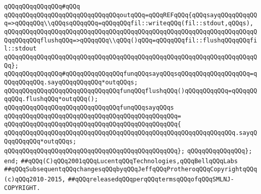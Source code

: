 \verb|qQQqqQQqqQQqqQQq#qQQq|\newline
\verb|qQQqqQQqqQQqqQQqqQQqqQQqqQQqqQQqoutqQQq=qQQqREFqQQq{qQQqsayqQQqqQQqqQQq=>qQQqqQQq\\qQQqsqQQqqQQq=qQQqqQQqfil::writeqQQq(fil::stdout,qQQqs),|\newline
\verb|qQQqqQQqqQQqqQQqqQQqqQQqqQQqqQQqqQQqqQQqqQQqqQQqqQQqqQQqqQQqqQQqqQQqqQQqqQQqqQQqflushqQQq=>qQQqqQQq\\qQQq()qQQq=qQQqqQQqfil::flushqQQqqQQqfil::stdout|\newline
\verb|qQQqqQQqqQQqqQQqqQQqqQQqqQQqqQQqqQQqqQQqqQQqqQQqqQQqqQQqqQQqqQQqqQQqqQQq};|\newline
\newline
\newline
\newline
\verb|qQQqqQQqqQQqqQQq#qQQqqQQqqQQqqQQqfunqQQqsayqQQqsqQQqqQQqqQQqqQQqqQQq=qQQqqQQqqQQq.sayqQQqqQQqqQQq*outqQQqs;|\newline
\verb|qQQqqQQqqQQqqQQqqQQqqQQqqQQqqQQqfunqQQqflushqQQq()qQQqqQQqqQQq=qQQqqQQqqQQq.flushqQQq*outqQQq();|\newline
\newline
\verb|qQQqqQQqqQQqqQQqqQQqqQQqqQQqqQQqfunqQQqsayqQQqs|\newline
\verb|qQQqqQQqqQQqqQQqqQQqqQQqqQQqqQQqqQQqqQQqqQQqqQQq=|\newline
\verb|qQQqqQQqqQQqqQQqqQQqqQQqqQQqqQQqqQQqqQQqqQQqqQQq{|\newline
\verb|qQQqqQQqqQQqqQQqqQQqqQQqqQQqqQQqqQQqqQQqqQQqqQQqqQQqqQQqqQQqqQQq.sayqQQqqQQqqQQq*outqQQqs;|\newline
\verb|qQQqqQQqqQQqqQQqqQQqqQQqqQQqqQQqqQQqqQQqqQQqqQQq};|\newline
\newline
\verb|qQQqqQQqqQQqqQQq};|\newline
\verb|end;|\newline
\newline
\verb|##qQQq(C)qQQq2001qQQqLucentqQQqTechnologies,qQQqBellqQQqLabs|\newline
\verb|##qQQqSubsequentqQQqchangesqQQqbyqQQqJeffqQQqProtheroqQQqCopyrightqQQq(c)qQQq2010-2015,|\newline
\verb|##qQQqreleasedqQQqperqQQqtermsqQQqofqQQqSMLNJ-COPYRIGHT.|\newline
\newline
\newline
\newline

